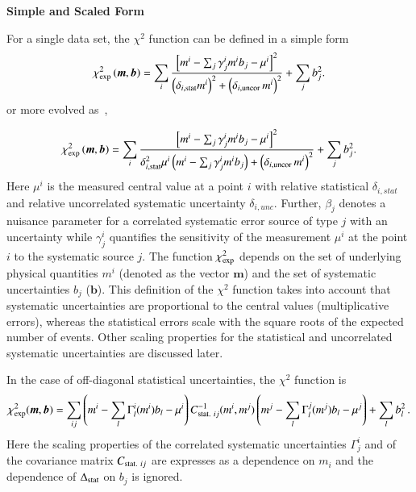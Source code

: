 \begin{description}
\item \bf{Simple and Scaled Form} \rm

For a single data set, the $\chi^2$ function can be defined in a simple form 
\begin{equation}
 \chi^2_{\rm exp}\left(\boldsymbol{m},\boldsymbol{b}\right) = %
 \sum_i
 \frac{\left[m^i
- \sum_j \gamma^i_j m^i b_j  - {\mu^i} \right]^2}
{ \textstyle \left(\delta_{i,{\rm stat}}m^i\right)^2 +
\left(\delta_{i,{\rm uncor}}\,  m^i\right)^2}
 + \sum_j b^2_j.
\label{eq:ave}\end{equation}
%
or more evolved as~\cite{H1:2009bp},

%
\begin{equation}
 \chi^2_{\rm exp}\left(\boldsymbol{m},\boldsymbol{b}\right) = %
 \sum_i
 \frac{\left[m^i
- \sum_j \gamma^i_j m^i b_j  - {\mu^i} \right]^2}
{ \textstyle \delta^2_{i,{\rm stat}}\mu^i \left(m^i -  \sum_j \gamma^i_j m^i b_j\right)+
\left(\delta_{i,{\rm uncor}}\,  m^i\right)^2}
 + \sum_j b^2_j.
\label{eq:aven}\end{equation}
%
Here ${\mu^i}$ is the  measured central value  at a point $i$ 
with  relative statistical $\delta_{i,stat}$ 
and relative uncorrelated systematic uncertainty $\delta_{i,unc}$.
Further, $\beta_j$ denotes a nuisance parameter for
 a correlated systematic error  source of type $j$ with an uncertainty
 while
$\gamma^i_j$ 
quantifies the sensitivity of the
measurement ${\mu^i}$ at the point $i$ to the systematic source $j$. 
The function $\chi^2_{\rm exp}$ depends on the set of
underlying physical quantities $m^i$ 
(denoted as the vector $\boldsymbol{m}$) and 
 the set of systematic uncertainties $b_j$ ($\boldsymbol{b}$).
This definition of the $\chi^2$ function takes into account that
systematic uncertainties are proportional to the central values 
(multiplicative errors), whereas the statistical errors scale 
with the square roots of the expected number of events. 
Other scaling properties for the statistical and uncorrelated
systematic uncertainties 
are discussed later.



In the case of off-diagonal statistical uncertainties, the $\chi^2$ function
is
\begin{equation} \label{eq:chi2gen}
\chi^2_{\rm exp} (\boldsymbol{m},\boldsymbol{b}) = \sum_{ij} \left ( m^i - \sum_l \Gamma^i_l(m^i)b_l - \mu^i \right)
  C^{-1}_{{\rm stat.}~ij}(m^i,m^j) \left(  m^j - \sum_l \Gamma^j_l(m^j)b_l - \mu^j \right) + 
\sum_l b^2_l \,.
\end{equation}
Here the scaling properties of the correlated systematic uncertainties 
$\Gamma^i_j$ and
of the covariance matrix $C_{{\rm stat.}~ij}$ are expresses as a dependence
on $m_i$ and the dependence of $\Delta_{\rm stat}$ on $b_j$ is ignored.


\end{description}
